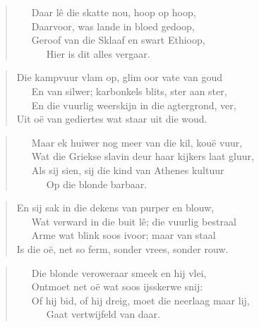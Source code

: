 \begin{verse}
\ \ \ Daar lê die skatte nou, hoop op hoop, \\ 
\ \ \ Daarvoor, was lande in bloed gedoop, \\ 
\ \ \ Geroof van die Sklaaf en swart Ethioop, \\ 
\ \ \ \ \ \ Hier is dit alles vergaar. \\ 
\end{verse}

\begin{verse}
Die kampvuur vlam op, glim oor vate van goud \\ 
\ \ \ En van silwer; karbonkels blits, ster aan ster, \\ 
\ \ \ En die vuurlig weerskijn in die agtergrond, ver, \\ 
Uit o\"e van gediertes wat staar uit die woud. \\ 
\end{verse}

\begin{verse}
\ \ \ Maar ek huiwer nog meer van die kil, kou\"e vuur, \\ 
\ \ \ Wat die Griekse slavin deur haar kijkers laat gluur, \\ 
\ \ \ Als sij sien, sij die kind van Athenes kultuur \\ 
\ \ \ \ \ \ Op die blonde barbaar. \\ 
\end{verse}

\begin{verse}
En sij sak in die dekens van purper en blouw, \\ 
\ \ \ Wat verward in die buit lê; die vuurlig bestraal \\ 
\ \ \ Arme wat blink soos ivoor; maar van staal \\ 
Is die o\"e, net so ferm, sonder vrees, sonder rouw. \\ 
\end{verse}

\begin{verse}
\ \ \ Die blonde veroweraar smeek en hij vlei, \\ 
\ \ \ Ontmoet net o\"e wat soos ijsskerwe snij: \\ 
\ \ \ Of hij bid, of hij dreig, moet die neerlaag maar lij, \\ 
\ \ \ \ \ \ Gaat vertwijfeld van daar. \\ 
\end{verse}

